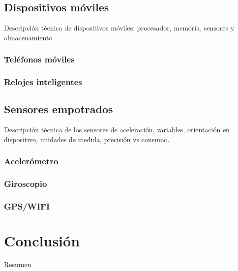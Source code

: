 \subsection{Dispositivos móviles}

\label{ssec46:dispositivos-moviles}Descripción técnica de dispositivos
móviles: procesador, memoria, sensores y almacenamiento

\subsubsection{Teléfonos móviles}

\subsubsection{Relojes inteligentes}

\subsection{Sensores empotrados}

\label{ssec46:sensores-empotrados}Descripción técnica de los sensores
de aceleración, variables, orientación en dispositivo, unidades de
medida, precisión vs consumo.

\subsubsection{Acelerómetro}

\subsubsection{Giroscopio}

\subsubsection{GPS/WIFI}

\section{Conclusión}

Resumen
